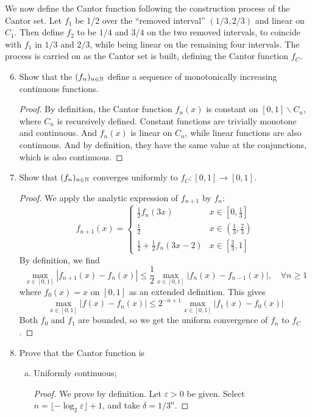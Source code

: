 We now define the Cantor function following the construction process of the Cantor set.
Let $f_1$ be 1/2 over the ``removed interval'' \((1/3,2/3)\) and linear on $C_1$.
Then define $f_2$ to be $1/4$ and $3/4$ on the two removed intervals, to coincide with $f_1$ in $1/3$ and $2/3$, while being linear on the remaining four intervals.
The process is carried on as the Cantor set is built, defining the Cantor function $f_C$.
\begin{enumerate}
	\setcounter{enumi}{5}
    \item Show that the \((f_n)_{n\in\mathbb{N}}\) define a sequence of monotonically increasing continuous functions.
    \begin{proof}
    By definition, the Cantor function \(f_n(x)\) is constant on \([0,1]\backslash C_n\), where $C_n$ is recursively defined.
    Constant functions are trivially monotone and continuous.
    And \(f_n(x)\) is linear on \(C_n\), while linear functions are also continuous.
    And by definition, they have the same value at the conjunctions, which is also continuous.
    \end{proof}
    \item Show that \((f_n)_{n\in\mathbb{N}}\) converges uniformly to \(f_C:[0,1]\to[0,1]\).
    \begin{proof}
    We apply the analytic expression of \(f_{n+1}\) by \(f_n\):
	\[ f_{n+1}(x)=\begin{cases} \frac{1}{2}f_n(3x) & x\in\left[0,\frac{1}{3} \right] \\ \frac{1}{2} & x\in\left(\frac{1}{3},\frac{2}{3} \right) \\ \frac{1}{2}+\frac{1}{2}f_n(3x-2) & x\in\left[\frac{2}{3},1 \right] \end{cases} \]
    By definition, we find
    \[ \max_{x\in[0,1]}|f_{n+1}(x)-f_n(x)|\leq \frac{1}{2}\max_{x\in[0,1]}|f_{n}(x)-f_{n-1}(x)|,\quad \forall n\geq1 \]
    where \(f_0(x)=x\) on \([0,1]\) as an extended definition. This gives
    \[ \max_{x\in[0,1]}|f(x)-f_n(x)|\leq 2^{-n+1}\max_{x\in[0,1]}|f_{1}(x)-f_{0}(x)| \]
    Both \(f_0\) and \(f_1\) are bounded, so we get the uniform convergence of $f_n$ to $f_C$.
    \end{proof}
    \item Prove that the Cantor function is
    \begin{enumerate}[(a)]
    	\item Uniformly continuous;
        \begin{proof}
        We prove by definition.
        Let \(\varepsilon>0\) be given.
        Select \(n=\lfloor-\log_2\varepsilon\rfloor+1\), and take \(\delta=1/3^n\).

\end{proof}
\end{enumerate}
\end{enumerate}
